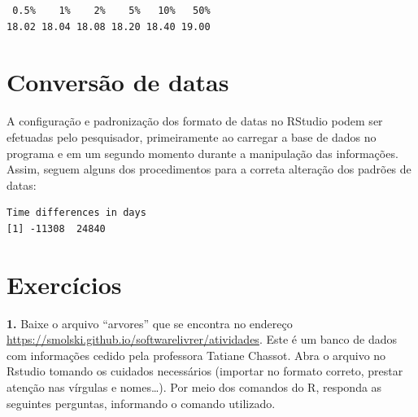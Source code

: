 \documentclass[12pt,portuguese,oneside]{book}
\newenvironment{Shaded}{\begin{snugshade}}{\end{snugshade}}
\newcommand{\KeywordTok}[1]{\textcolor[rgb]{0.13,0.29,0.53}{\textbf{#1}}}
\newcommand{\DataTypeTok}[1]{\textcolor[rgb]{0.13,0.29,0.53}{#1}}
\newcommand{\StringTok}[1]{\textcolor[rgb]{0.31,0.60,0.02}{#1}}
\newcommand{\CommentTok}[1]{\textcolor[rgb]{0.56,0.35,0.01}{\textit{#1}}}
\newcommand{\OperatorTok}[1]{\textcolor[rgb]{0.81,0.36,0.00}{\textbf{#1}}}
\newcommand{\NormalTok}[1]{#1}
\begin{document}
\begin{verbatim}
 0.5%    1%    2%    5%   10%   50% 
18.02 18.04 18.08 18.20 18.40 19.00 
\end{verbatim}

\section{Conversão de datas}\label{conversao-de-datas}

A configuração e padronização dos formato de datas no RStudio podem ser
efetuadas pelo pesquisador, primeiramente ao carregar a base de dados no
programa e em um segundo momento durante a manipulação das informações.
Assim, seguem alguns dos procedimentos para a correta alteração dos
padrões de datas:

\begin{Shaded}
\end{Shaded}

\begin{verbatim}
Time differences in days
[1] -11308  24840
\end{verbatim}

\section{Exercícios}\label{exercicios}

\textbf{1.} Baixe o arquivo ``arvores'' que se encontra no endereço
\url{https://smolski.github.io/softwarelivrer/atividades}. Este é um
banco de dados com informações cedido pela professora Tatiane Chassot.
Abra o arquivo no Rstudio tomando os cuidados necessários (importar no
formato correto, prestar atenção nas vírgulas e nomes\ldots{}). Por meio
dos comandos do R, responda as seguintes perguntas, informando o comando
utilizado.
\end{document}
